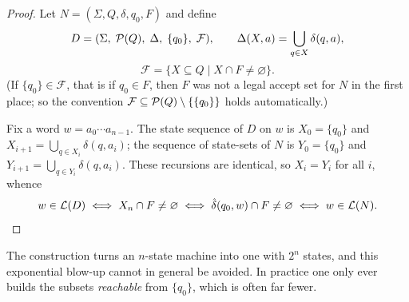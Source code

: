 \documentclass[a4paper]{scrartcl}
\newcommand{\lang}{\mathcal{L}}
\begin{document}
\begin{proof}
	Let $N = (\Sigma, Q, \delta, q_0, F)$ and define
	$$D = (\Sigma,\; \mathcal{P}(Q),\; \Delta,\; \{q_0\},\; \mathcal{F}), \qquad \Delta(X, a) = \bigcup_{q \in X} \delta(q, a),$$
	$$\mathcal{F} = \{X \subseteq Q \mid X \cap F \neq \varnothing\}.$$
	(If $\{q_0\} \in \mathcal{F}$, that is if $q_0 \in F$, then $F$ was not a legal accept set for $N$ in the first place; so the convention $\mathcal{F} \subseteq \mathcal{P}(Q) \setminus \{\{q_0\}\}$ holds automatically.)

	Fix a word $w = a_0\cdots a_{n-1}$. The state sequence of $D$ on $w$ is $X_0 = \{q_0\}$ and $X_{i+1} = \bigcup_{q \in X_i}\delta(q, a_i)$; the sequence of state-sets of $N$ is $Y_0 = \{q_0\}$ and $Y_{i+1} = \bigcup_{q \in Y_i}\delta(q,a_i)$. These recursions are identical, so $X_i = Y_i$ for all $i$, whence
	$$w \in \lang(D) \iff X_n \cap F \neq \varnothing \iff \hat\delta(q_0,w) \cap F \neq \varnothing \iff w \in \lang(N). \qedhere$$
\end{proof}

\begin{remark}
	The construction turns an $n$-state machine into one with $2^n$ states, and this exponential blow-up cannot in general be avoided. In practice one only ever builds the subsets \emph{reachable} from $\{q_0\}$, which is often far fewer.
\end{remark}
\end{document}

